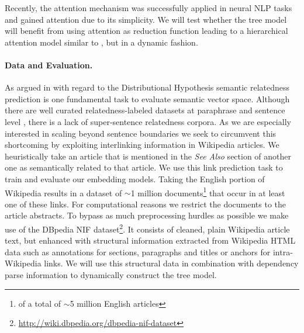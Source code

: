 Recently, the attention mechanism \autocite{bahdanau_neural_2014,xu_show_2015} was successfully applied in neural \ac{NLP} tasks \autocite{zhuang_neobility_2017,vaswani_attention_2017} and gained attention due to its simplicity. We will test whether the tree model will benefit from using attention as reduction function leading to a hierarchical attention model similar to \textcite{yang_hierarchical_2016}, but in a dynamic fashion. %


\paragraph{Data and Evaluation.}As argued in \textcite{binder_comparison_2018} with regard to the Distributional Hypothesis \autocite{harris_distributional_1954} semantic relatedness \autocite{resnik_semantic_1999, budanitsky_evaluating_2006} prediction is one fundamental task to evaluate semantic vector space. Although there are well curated relatedness-labeled datasets at paraphrase and sentence level \autocite{pavlick_ppdb_2015, dolan_automatically_2005, marelli_sick_2014,cer_semeval-2017_2017}, there is a lack of super-sentence relatedness corpora. As we are especially interested in scaling beyond sentence boundaries %
we seek to circumvent this shortcoming by exploiting interlinking information in Wikipedia articles. We heuristically take an article that is mentioned in the \textit{See Also} %
section of another one as semantically related to that article. We use this link prediction task to train and evaluate our embedding models. Taking the English portion of Wikipedia results in a dataset of $\sim$1 million documents\footnote{of a total of $\sim$5 million English articles} that occur in at least one of these links. For computational reasons we restrict the documents to the article abstracts. To bypass as much preprocessing hurdles as possible we make use of the DBpedia NIF \autocite{dojchinovski_dbpedia_2018} dataset\footnote{\url{http://wiki.dbpedia.org/dbpedia-nif-dataset}}. It consists of cleaned, plain Wikipedia article text, but enhanced with structural information extracted from Wikipedia HTML data such as annotations for sections, paragraphs and titles or anchors for intra-Wikipedia links. We will use this structural data in combination with dependency parse information to dynamically construct the tree model.

